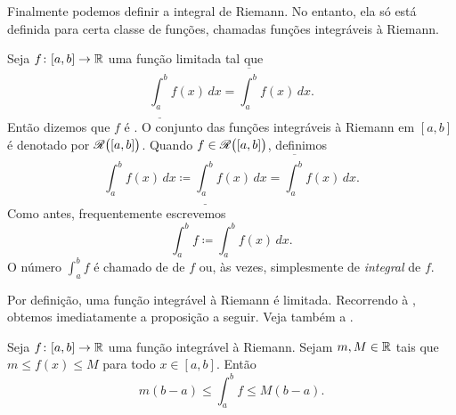 Finalmente podemos definir a integral de Riemann. No entanto, ela só está
definida para certa classe de funções, chamadas funções integráveis à
Riemann.

\begin{defn}
Seja $f \colon [a,b] \to {\mathbb{R}}$ uma função limitada tal que
\begin{equation*}
\underline{\int_a^b} f(x)\,dx = \overline{\int_a^b} f(x)\,dx .
\end{equation*}
Então dizemos que $f$ é \emph{}.
O conjunto das funções integráveis à Riemann em $[a,b]$ é denotado
por ${\mathscr{R}}\bigl([a,b]\bigr)$.
Quando $f \in {\mathscr{R}}\bigl([a,b]\bigr)$, definimos
\begin{equation*}
\int_a^b f(x)\,dx \coloneqq 
\underline{\int_a^b} f(x)\,dx = \overline{\int_a^b} f(x)\,dx .
\end{equation*}
Como antes, frequentemente escrevemos
\begin{equation*}
\int_a^b f \coloneqq \int_a^b f(x)\,dx.
\end{equation*}
O número $\int_a^b f$ é chamado de \emph{}
de $f$ ou, às vezes, simplesmente de \emph{integral} de $f$.
\end{defn}

Por definição, uma função integrável à Riemann é limitada.
Recorrendo à , obtemos imediatamente
a proposição a seguir. Veja também a .

\begin{prop} \label{intbound:prop}
Seja $f \colon [a,b] \to {\mathbb{R}}$ uma função integrável à Riemann.
Sejam $m, M \in {\mathbb{R}}$
tais que $m \leq f(x) \leq M$ para todo $x \in [a,b]$. Então
\begin{equation*}
m(b-a) \leq
\int_a^b f
\leq M(b-a) .
\end{equation*}
\end{prop}
\begin{myfigureht}
\caption{A área sob a curva é limitada superiormente pela área do retângulo
inteiro, $M(b-a)$, e inferiormente pela área da parte sombreada,
$m(b-a)$.\label{fig:integralminmax}}
\end{myfigureht}

